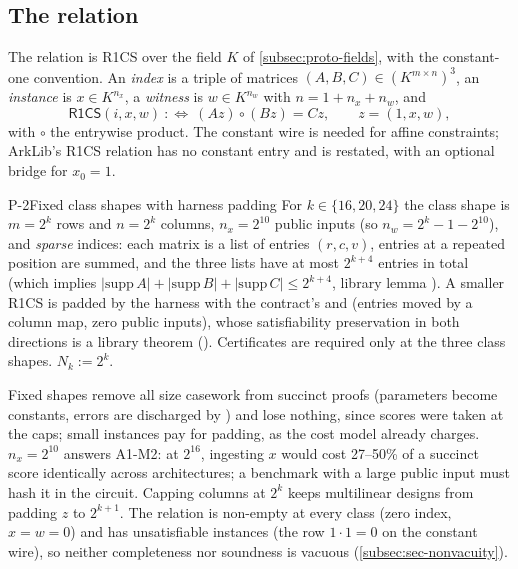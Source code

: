 \subsection{The relation}\label{subsec:proto-relation}

The relation is R1CS over the field $K$ of \cref{subsec:proto-fields}, with the constant-one
convention. An \emph{index} is a triple of matrices $(A,B,C)\in (K^{m\times n})^3$, an
\emph{instance} is $x\in K^{n_x}$, a \emph{witness} is $w\in K^{n_w}$ with $n=1+n_x+n_w$, and
\[ \mathsf{R1CS}(i,x,w)\ :\Longleftrightarrow\ (Az)\circ(Bz)=Cz,\qquad z=(1,x,w), \]
with $\circ$ the entrywise product. The constant wire is needed for affine constraints; ArkLib's
R1CS relation has no constant entry and is restated, with an optional bridge for $x_0=1$.

\begin{decision}{P-2}{Fixed class shapes with harness padding}
For $k\in\{16,20,24\}$ the class shape is $m=2^k$ rows and $n=2^k$ columns, $n_x=2^{10}$ public
inputs (so $n_w=2^k-1-2^{10}$), and \emph{sparse} indices: each matrix is a list of entries
$(r,c,v)$, entries at a repeated position are summed, and the three lists have at most
$2^{k+4}$ entries in total (which implies
$|\mathrm{supp}\,A|+|\mathrm{supp}\,B|+|\mathrm{supp}\,C|\le 2^{k+4}$, library lemma
). A smaller R1CS is padded by the harness with the contract's
 and  (entries moved by a column map, zero public inputs), whose
satisfiability preservation in both directions is a library theorem ().
Certificates are required only at the three class shapes. $N_k:=2^k$.
\end{decision}

\noindent Fixed shapes remove all size casework from succinct proofs (parameters become constants,
errors are discharged by ) and lose nothing, since scores were taken at the caps;
small instances pay for padding, as the cost model already charges. $n_x=2^{10}$ answers A1-M2: at
$2^{16}$, ingesting $x$ would cost 27--50\% of a succinct score identically across architectures; a
benchmark with a large public input must hash it in the circuit. Capping columns at $2^k$ keeps
multilinear designs from padding $z$ to $2^{k+1}$. The relation is non-empty at every class (zero
index, $x=w=0$) and has unsatisfiable instances (the row $1\cdot1=0$ on the constant wire), so
neither completeness nor soundness is vacuous (\cref{subsec:sec-nonvacuity}).

